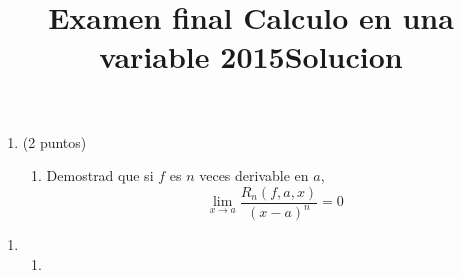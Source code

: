\documentclass{article}
\begin{document}
\title{Examen final Calculo en una variable 2015}
\date {}
\maketitle

\begin{enumerate}
\item (2 puntos)
\begin{enumerate}
\item Demostrad que si $f$ es $n$ veces derivable en $a$,
$$
\lim_{x \to a} \frac{R_n(f, a, x)}{(x-a)^n} = 0
$$
\end{enumerate}

\end{enumerate}

\newpage
\title{Solucion}
\date{}
\maketitle

\begin{enumerate}
\item \begin{enumerate}
\item
\end{enumerate}
\end{enumerate}
\end{document}
